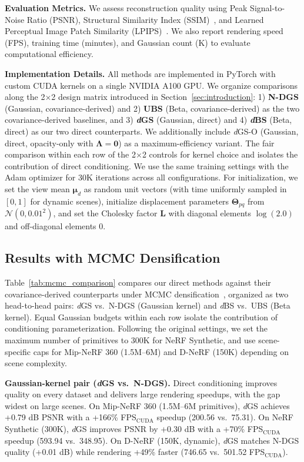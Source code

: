 \documentclass{article}
\newcommand{\dgs}{\textit{d}GS\xspace}
\newcommand{\dbs}{\textit{d}BS\xspace}
\newcommand{\dgso}{\textit{d}GS-O\xspace}
\theoremstyle{plain}
\theoremstyle{definition}
\theoremstyle{remark}
\begin{document}
\textbf{Evaluation Metrics.}
We assess reconstruction quality using Peak Signal-to-Noise Ratio (PSNR), Structural Similarity Index (SSIM)~\cite{wang2004image}, and Learned Perceptual Image Patch Similarity (LPIPS)~\cite{zhang2018perceptual}. We also report rendering speed (FPS), training time (minutes), and Gaussian count (K) to evaluate computational efficiency.

\textbf{Implementation Details.}
All methods are implemented in PyTorch with custom CUDA kernels on a single NVIDIA A100 GPU. We organize comparisons along the 2$\times$2 design matrix introduced in Section~\ref{sec:introduction}: 1) \textbf{N-DGS} (Gaussian, covariance-derived) and 2) \textbf{UBS} (Beta, covariance-derived) as the two covariance-derived baselines, and 3) \textbf{\dgs{}} (Gaussian, direct) and 4) \textbf{\dbs{}} (Beta, direct) as our two direct counterparts. We additionally include \dgso{} (Gaussian, direct, opacity-only with $\boldsymbol{\Lambda}{=}\mathbf{0}$) as a maximum-efficiency variant. The fair comparison within each row of the 2$\times$2 controls for kernel choice and isolates the contribution of direct conditioning. We use the same training settings with the Adam optimizer for 30K iterations across all configurations. For initialization, we set the view mean $\boldsymbol{\mu}_d$ as random unit vectors (with time uniformly sampled in $[0, 1]$ for dynamic scenes), initialize displacement parameters $\boldsymbol{\Theta}_{pq}$ from $\mathcal{N}(0, 0.01^2)$, and set the Cholesky factor $\mathbf{L}$ with diagonal elements $\log(2.0)$ and off-diagonal elements 0.

\subsection{Results with MCMC Densification}

Table~\ref{tab:mcmc_comparison} compares our direct methods against their covariance-derived counterparts under MCMC densification~\cite{kheradmand20243d}, organized as two head-to-head pairs: \dgs{} vs.\ N-DGS (Gaussian kernel) and \dbs{} vs.\ UBS (Beta kernel). Equal Gaussian budgets within each row isolate the contribution of conditioning parameterization. Following the original settings, we set the maximum number of primitives to 300K for NeRF Synthetic, and use scene-specific caps for Mip-NeRF 360 (1.5M--6M) and D-NeRF (150K) depending on scene complexity.

\textbf{Gaussian-kernel pair (\dgs{} vs.\ N-DGS).} Direct conditioning improves quality on every dataset and delivers large rendering speedups, with the gap widest on large scenes. On Mip-NeRF 360 (1.5M--6M primitives), \dgs{} achieves +0.79 dB PSNR with a +166\% FPS$_{\text{CUDA}}$ speedup (200.56 vs.\ 75.31). On NeRF Synthetic (300K), \dgs{} improves PSNR by +0.30 dB with a +70\% FPS$_{\text{CUDA}}$ speedup (593.94 vs.\ 348.95). On D-NeRF (150K, dynamic), \dgs{} matches N-DGS quality (+0.01 dB) while rendering +49\% faster (746.65 vs.\ 501.52 FPS$_{\text{CUDA}}$).
\end{document}
